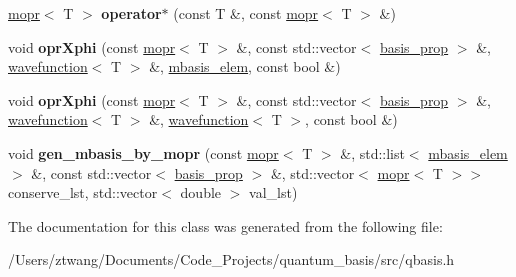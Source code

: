 \begin{DoxyCompactItemize}
\mbox{\label{classqbasis_1_1mopr_ad17b2f7a947c84f618bab4d589150deb}} 
\hyperlink{classqbasis_1_1mopr}{mopr}$<$ T $>$ {\bfseries operator$\ast$} (const T \&, const \hyperlink{classqbasis_1_1mopr}{mopr}$<$ T $>$ \&)
\item 
\mbox{\label{classqbasis_1_1mopr_a3fec6e182555899e170646f231d6d759}} 
void {\bfseries opr\+Xphi} (const \hyperlink{classqbasis_1_1mopr}{mopr}$<$ T $>$ \&, const std\+::vector$<$ \hyperlink{classqbasis_1_1basis__prop}{basis\+\_\+prop} $>$ \&, \hyperlink{classqbasis_1_1wavefunction}{wavefunction}$<$ T $>$ \&, \hyperlink{classqbasis_1_1mbasis__elem}{mbasis\+\_\+elem}, const bool \&)
\item 
\mbox{\label{classqbasis_1_1mopr_a2579cd6e4389cbf1e32d3addc3733f85}} 
void {\bfseries opr\+Xphi} (const \hyperlink{classqbasis_1_1mopr}{mopr}$<$ T $>$ \&, const std\+::vector$<$ \hyperlink{classqbasis_1_1basis__prop}{basis\+\_\+prop} $>$ \&, \hyperlink{classqbasis_1_1wavefunction}{wavefunction}$<$ T $>$ \&, \hyperlink{classqbasis_1_1wavefunction}{wavefunction}$<$ T $>$, const bool \&)
\item 
\mbox{\label{classqbasis_1_1mopr_a4eb4692297545b8baf275681ed69f625}} 
void {\bfseries gen\+\_\+mbasis\+\_\+by\+\_\+mopr} (const \hyperlink{classqbasis_1_1mopr}{mopr}$<$ T $>$ \&, std\+::list$<$ \hyperlink{classqbasis_1_1mbasis__elem}{mbasis\+\_\+elem} $>$ \&, const std\+::vector$<$ \hyperlink{classqbasis_1_1basis__prop}{basis\+\_\+prop} $>$ \&, std\+::vector$<$ \hyperlink{classqbasis_1_1mopr}{mopr}$<$ T $>$$>$ conserve\+\_\+lst, std\+::vector$<$ double $>$ val\+\_\+lst)
\end{DoxyCompactItemize}


The documentation for this class was generated from the following file\+:\begin{DoxyCompactItemize}
\item 
/\+Users/ztwang/\+Documents/\+Code\+\_\+\+Projects/quantum\+\_\+basis/src/qbasis.\+h\end{DoxyCompactItemize}
